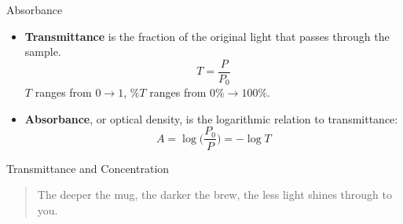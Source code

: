 \documentclass[notes=only]{beamer}
\begin{document}
\begin{frame}{Absorbance}
	\begin{itemize}
		\item \textbf{Transmittance} is the fraction of the original
			light that passes through the sample.
			\begin{equation*}
				T = \frac{P}{P_0}
			\end{equation*}
			\alert{$T$} ranges from $0 \rightarrow 1$, \alert{$\%T$}
			ranges from $0\% \rightarrow 100\%$.
		\item \textbf{Absorbance}, or optical density, is the
			logarithmic relation to transmittance:
			\begin{equation*}
				A = \log \bigg( \frac{P_0}{P} \bigg) = -\log T
			\end{equation*}
			
			\begin{center}
			\end{center}
	\end{itemize}
\end{frame}

\begin{frame}[t]{Transmittance and Concentration}
	\begin{quote}
		The deeper the mug, the darker the brew, the less light shines
		through to you.
	\end{quote}

	\bigskip


\end{frame}
\end{document}

